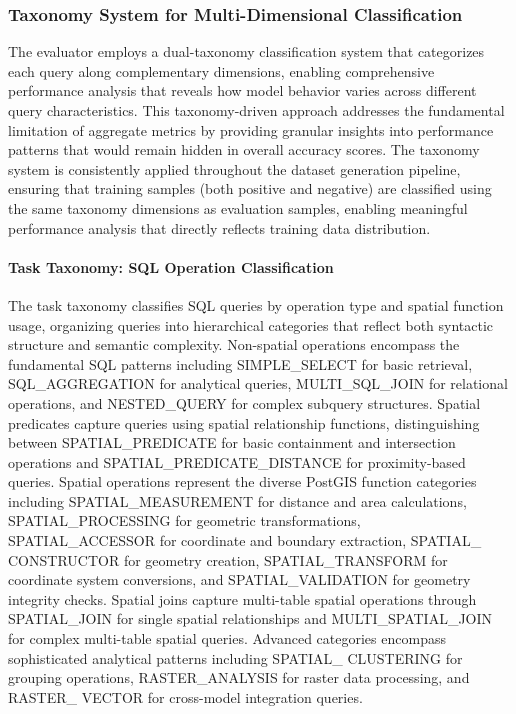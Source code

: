 \subsubsection{Taxonomy System for Multi-Dimensional Classification}
\label{subsec:taxonomy}

The evaluator employs a dual-taxonomy classification system that categorizes each query along complementary dimensions, enabling comprehensive performance analysis that reveals how model behavior varies across different query characteristics. This taxonomy-driven approach addresses the fundamental limitation of aggregate metrics by providing granular insights into performance patterns that would remain hidden in overall accuracy scores. The taxonomy system is consistently applied throughout the dataset generation pipeline, ensuring that training samples (both positive and negative) are classified using the same taxonomy dimensions as evaluation samples, enabling meaningful performance analysis that directly reflects training data distribution.

\paragraph{Task Taxonomy: SQL Operation Classification}

The task taxonomy classifies SQL queries by operation type and spatial function usage, organizing queries into hierarchical categories that reflect both syntactic structure and semantic complexity. Non-spatial operations encompass the fundamental SQL patterns including SIMPLE\_SELECT for basic retrieval, SQL\_AGGREGATION for analytical queries,  MULTI\_SQL\_JOIN for relational operations, and NESTED\_QUERY for complex subquery structures. Spatial predicates capture queries using spatial relationship functions, distinguishing between SPATIAL\_PREDICATE for basic containment and intersection operations and SPATIAL\_PREDICATE\_DISTANCE for proximity-based queries. Spatial operations represent the diverse PostGIS function categories including SPATIAL\_MEASUREMENT for distance and area calculations, SPATIAL\_PROCESSING for geometric transformations, SPATIAL\_ACCESSOR for coordinate and boundary extraction, SPATIAL\_ CONSTRUCTOR for geometry creation, SPATIAL\_TRANSFORM for coordinate system conversions, and SPATIAL\_VALIDATION for geometry integrity checks. Spatial joins capture multi-table spatial operations through SPATIAL\_JOIN for single spatial relationships and MULTI\_SPATIAL\_JOIN for complex multi-table spatial queries. Advanced categories encompass sophisticated analytical patterns including SPATIAL\_ CLUSTERING for grouping operations, RASTER\_ANALYSIS for raster data processing, and RASTER\_ VECTOR for cross-model integration queries.

